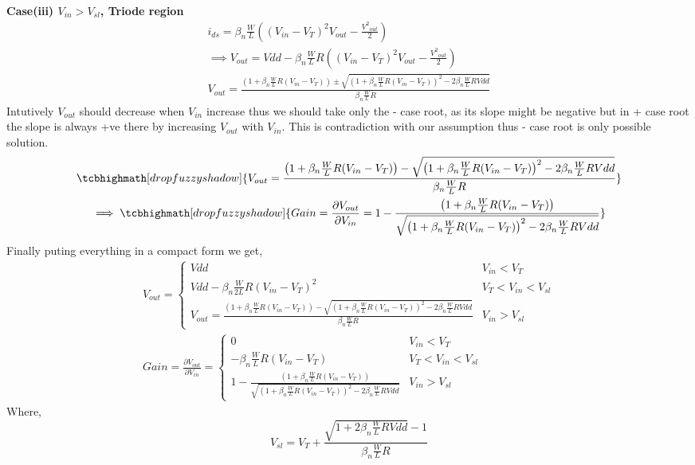 \documentclass{article}
\begin{document}
 \newline
\textbf{Case(iii) $V_{in} > V_{sl}$, Triode region}\\
\begin{gather*}
i_{ds} = {{\beta}_n}{\frac{W}{L}}((V_{in} - V_T)^2V_{out} - \frac{{V^2}_{out}}{2})\\
\implies V_{out} = Vdd - {{\beta}_n}{\frac{W}{L}}R((V_{in} - V_T)^2V_{out} - \frac{{V^2}_{out}}{2})\\
V_{out} = \frac{\left(1 + {{\beta}_n}{\frac{W}{L}}R(V_{in} - V_T)\right) \pm \sqrt{\left(1 + {{\beta}_n}{\frac{W}{L}}R(V_{in} - V_T)\right)^2 - 2{{\beta}_n}{\frac{W}{L}}RVdd}}{{{\beta}_n}{\frac{W}{L}}R}
\end{gather*}
Intutively $V_{out}$ should decrease when $V_{in}$ increase thus we should take only the - case root, as its slope might be negative but in + case root the slope is always +ve there by increasing $V_{out}$ with $V_{in}$. This is contradiction with our assumption thus - case root is only possible solution.\\
\begin{gather*}
\tcbhighmath[drop fuzzy shadow]{V_{out} = \frac{\left(1 + {{\beta}_n}{\frac{W}{L}}R(V_{in} - V_T)\right) - \sqrt{\left(1 + {{\beta}_n}{\frac{W}{L}}R(V_{in} - V_T)\right)^2 - 2{{\beta}_n}{\frac{W}{L}}RVdd}}{{{\beta}_n}{\frac{W}{L}}R}}\\
\implies \tcbhighmath[drop fuzzy shadow]{Gain = \frac{\partial V_{out}}{\partial V_{in}} = 1 - \frac{\left(1 + {{\beta}_n}{\frac{W}{L}}R(V_{in} - V_T)\right)}{\sqrt{\left(1 + {{\beta}_n}{\frac{W}{L}}R(V_{in} - V_T)\right)^2 - 2{{\beta}_n}{\frac{W}{L}}RVdd}}}
\end{gather*}
Finally puting everything in a compact form we get,\\
\begin{gather}
V_{out} = \begin{cases}
	Vdd & V_{in} < V_T\\
	Vdd - {{\beta}_n}{\frac{W}{2L}}R(V_{in} - V_T)^2 & V_T < V_{in} < V_{sl}\\
	V_{out} = \frac{\left(1 + {{\beta}_n}{\frac{W}{L}}R(V_{in} - V_T)\right) - \sqrt{\left(1 + {{\beta}_n}{\frac{W}{L}}R(V_{in} - V_T)\right)^2 - 2{{\beta}_n}{\frac{W}{L}}RVdd}}{{{\beta}_n}{\frac{W}{L}}R} & V_{in} > V_{sl}
\end{cases} \label{eq:vout}\\
Gain = \frac{\partial V_{out}}{\partial V_{in}} = \begin{cases}
0 & V_{in} < V_T\\
-{{\beta}_n}{\frac{W}{L}}R(V_{in}-V_T) & V_{T} < V_{in} < V_{sl}\\
1 - \frac{\left(1 + {{\beta}_n}{\frac{W}{L}}R(V_{in} - V_T)\right)}{\sqrt{\left(1 + {{\beta}_n}{\frac{W}{L}}R(V_{in} - V_T)\right)^2 - 2{{\beta}_n}{\frac{W}{L}}RVdd}} & V_{in} > V_{sl}
\end{cases} \label{eq:gain}
\end{gather}
Where,
\begin{equation} \label{eq:vsl}
{V_{sl} = V_T + \frac{\sqrt{1 + 2{{\beta}_n}{\frac{W}{L}}RVdd}-1}{{{\beta}_n}{\frac{W}{L}}R}}
\end{equation}
\end{document}
